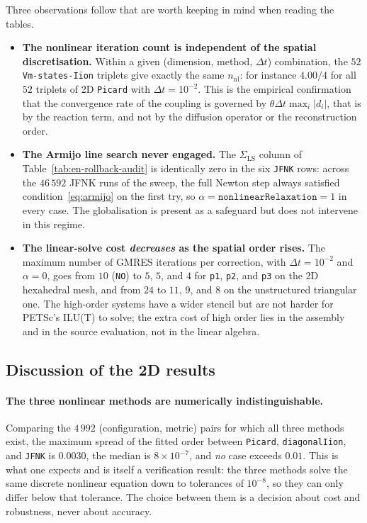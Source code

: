 \documentclass[11pt,a4paper]{article}
\newcommand{\code}[1]{\texttt{\small #1}}
\begin{document}
Three observations follow that are worth keeping in mind when reading the
tables.

\begin{itemize}
\item \textbf{The nonlinear iteration count is independent of the spatial
discretisation.} Within a given (dimension, method, $\Delta t$) combination, the
$52$ \code{Vm-states-Iion} triplets give exactly the same $n_{\mathrm{nl}}$: for
instance $4.00/4$ for all $52$ triplets of 2D \code{Picard} with
$\Delta t=10^{-2}$. This is the empirical confirmation that the convergence rate
of the coupling is governed by $\theta\Delta t\max_i|d_i|$, that is by the
reaction term, and not by the diffusion operator or the reconstruction order.

\item \textbf{The Armijo line search never engaged.} The
$\Sigma_{\mathrm{LS}}$ column of Table~\ref{tab:en-rollback-audit} is identically
zero in the six \code{JFNK} rows: across the $46\,592$ JFNK runs of the sweep,
the full Newton step always satisfied condition~\eqref{eq:armijo} on the first
try, so $\alpha=\texttt{nonlinearRelaxation}=1$ in every case. The globalisation
is present as a safeguard but does not intervene in this regime.

\item \textbf{The linear-solve cost \emph{decreases} as the spatial order
rises.} The maximum number of GMRES iterations per correction, with
$\Delta t=10^{-2}$ and $\alpha=0$, goes from $10$ (\code{NO}) to $5$, $5$, and
$4$ for \code{p1}, \code{p2}, and \code{p3} on the 2D hexahedral mesh, and from
$24$ to $11$, $9$, and $8$ on the unstructured triangular one. The high-order
systems have a wider stencil but are not harder for PETSc's ILU(T) to solve; the
extra cost of high order lies in the assembly and in the source evaluation, not
in the linear algebra.
\end{itemize}



\FloatBarrier

\subsection{Discussion of the 2D results}
\label{sec:en-conclusions-2d}

\paragraph{The three nonlinear methods are numerically indistinguishable.}
Comparing the $4\,992$ (configuration, metric) pairs for which all three methods
exist, the maximum spread of the fitted order between \code{Picard},
\code{diagonalIion}, and \code{JFNK} is $0.0030$, the median is
$8\times10^{-7}$, and \emph{no} case exceeds $0.01$. This is what one expects and
is itself a verification result: the three methods solve the same discrete
nonlinear equation down to tolerances of $10^{-8}$, so they can only differ below
that tolerance. The choice between them is a decision about cost and robustness,
never about accuracy.
\end{document}
